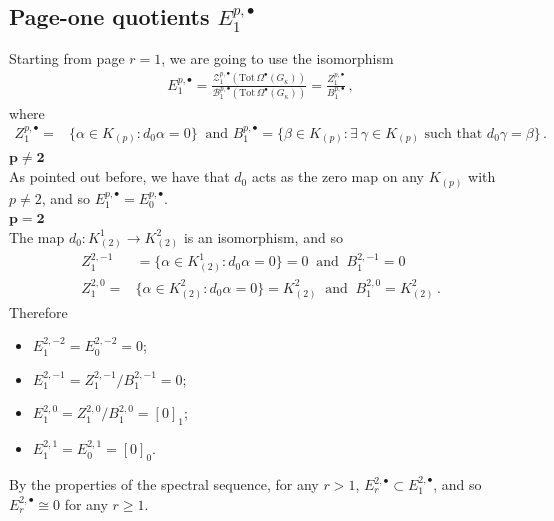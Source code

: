 \documentclass[10pt]{amsart}
\theoremstyle{remark}
\numberwithin{equation}{section}
\begin{document}
\subsection{Page-one quotients $E_1^{p,\bullet}$} 
Starting from page $r=1$, we are going to use the isomorphism
\begin{align*}
    E_1^{p,\bullet}=\frac{\mathcal{Z}_1^{p,\bullet}(\mathrm{Tot}\,\Omega^\bullet(G_\kappa))}{\mathcal{B}_1^{p,\bullet}(\mathrm{Tot}\,\Omega^\bullet(G_\kappa))}=\frac{Z_1^{p,\bullet}}{B_1^{p,\bullet}}\,,
\end{align*}
where
\begin{align*}
    Z_1^{p,\bullet}=&\lbrace\alpha\in K_{(p)}: d_0\alpha=0\rbrace\ \text{ and }
    B_1^{p,\bullet}=\lbrace\beta\in K_{(p)}: \exists\ \gamma\in K_{(p)}\text{ such that }d_0\gamma=\beta\rbrace\,.
\end{align*}
$\mathbf{p\neq 2}$\\ As pointed out before, we have that $d_0$ acts as the zero map on any $K_{(p)}$ with $p\neq 2$, and so $E_1^{p,\bullet}=E^{p,\bullet}_0$.\\
$\mathbf{p=2}$\\ The map $d_0\colon K^1_{(2)}\to K^2_{(2)}$
is an isomorphism, and so
\begin{align*}
    Z_1^{2,-1}&=\lbrace \alpha\in K^1_{(2)}: d_0\alpha=0\rbrace= 0 \ \text{ and }\ B_1^{2,-1}= 0\\
    Z_1^{2,0}=&\lbrace \alpha\in K^2_{(2)}: d_0\alpha=0\rbrace=K^2_{(2)}\ \text{ and }\ B_1^{2,0}=K^2_{(2)}\,.
\end{align*}
Therefore
\begin{itemize}
    \item $E^{2,-2}_1=E^{2,-2}_0=0$;
    \item $E_1^{2,-1}=Z_1^{2,-1}/B_1^{2,-1}=0$;
    \item $E_1^{2,0}=Z_1^{2,0}/B_1^{2,0}= [0]_1$;
    \item $E_1^{2,1}=E_0^{2,1}=[0]_0$.
\end{itemize}
By the properties of the spectral sequence, for any $r> 1$, $E_r^{2,\bullet}\subset E_1^{2,\bullet}$, and so $E^{2,\bullet}_r\cong 0$ for any $r\ge 1$.
\end{document}
